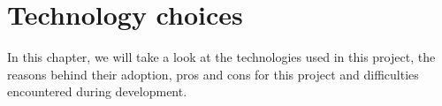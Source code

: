 \chapter{Technology choices}

  In this chapter, we will take a look at the technologies used in this project,
  the reasons behind their adoption, pros and cons for this project and
  difficulties encountered during development.

  
  
  
  
